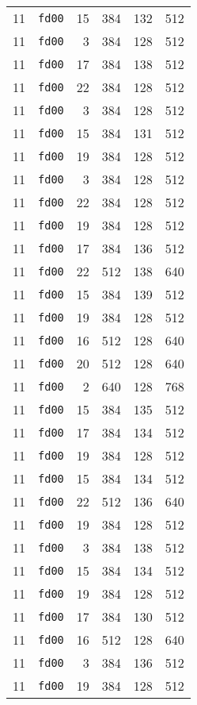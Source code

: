 \documentclass{article}
\begin{document}
\begin{table}[h!]
\begin{tabular}{llrrrl}
    11 & \texttt{fd00} & 15 & 384 & 132 & 512 \\
    11 & \texttt{fd00} & 3 & 384 & 128 & 512 \\
    11 & \texttt{fd00} & 17 & 384 & 138 & 512 \\
    11 & \texttt{fd00} & 22 & 384 & 128 & 512 \\
    11 & \texttt{fd00} & 3 & 384 & 128 & 512 \\
    11 & \texttt{fd00} & 15 & 384 & 131 & 512 \\
    11 & \texttt{fd00} & 19 & 384 & 128 & 512 \\
    11 & \texttt{fd00} & 3 & 384 & 128 & 512 \\
    11 & \texttt{fd00} & 22 & 384 & 128 & 512 \\
    11 & \texttt{fd00} & 19 & 384 & 128 & 512 \\
    11 & \texttt{fd00} & 17 & 384 & 136 & 512 \\
    11 & \texttt{fd00} & 22 & 512 & 138 & 640 \\
    11 & \texttt{fd00} & 15 & 384 & 139 & 512 \\
    11 & \texttt{fd00} & 19 & 384 & 128 & 512 \\
    11 & \texttt{fd00} & 16 & 512 & 128 & 640 \\
    11 & \texttt{fd00} & 20 & 512 & 128 & 640 \\
    11 & \texttt{fd00} & 2 & 640 & 128 & 768 \\
    11 & \texttt{fd00} & 15 & 384 & 135 & 512 \\
    11 & \texttt{fd00} & 17 & 384 & 134 & 512 \\
    11 & \texttt{fd00} & 19 & 384 & 128 & 512 \\
    11 & \texttt{fd00} & 15 & 384 & 134 & 512 \\
    11 & \texttt{fd00} & 22 & 512 & 136 & 640 \\
    11 & \texttt{fd00} & 19 & 384 & 128 & 512 \\
    11 & \texttt{fd00} & 3 & 384 & 138 & 512 \\
    11 & \texttt{fd00} & 15 & 384 & 134 & 512 \\
    11 & \texttt{fd00} & 19 & 384 & 128 & 512 \\
    11 & \texttt{fd00} & 17 & 384 & 130 & 512 \\
    11 & \texttt{fd00} & 16 & 512 & 128 & 640 \\
    11 & \texttt{fd00} & 3 & 384 & 136 & 512 \\
    11 & \texttt{fd00} & 19 & 384 & 128 & 512 \\

\end{tabular}
\end{table}
\end{document}
